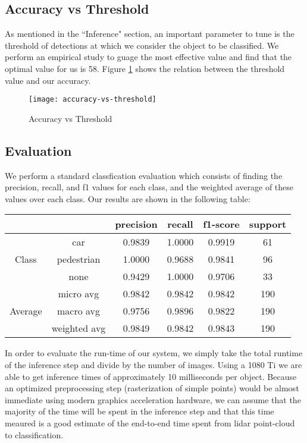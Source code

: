 \documentclass[runningheads,a4paper]{llncs}
\begin{document}
\subsection{Accuracy vs Threshold}
As mentioned in the ``Inference" section, an important parameter to tune is the threshold
of detections at which we consider the object to be classified. We perform an empirical
study to guage the most effective value and find that the optimal value for us is 58.
Figure \ref{fig:accuracy-vs-threshold} shows the relation between the threshold value
and our accuracy.


\begin{figure}[h]
  \caption{Accuracy vs Threshold}
  \centering
  \texttt{[image: accuracy-vs-threshold]}
  \label{fig:accuracy-vs-threshold}
\end{figure}


\subsection{Evaluation}
We perform a standard classfication evaluation which consists of finding the precision,
recall, and f1 values for each class, and the weighted average of these values over each
class. Our results are shown in the following table: 

\begin{center}
\begin{tabular}{ |c|c|c|c|c|c| } 
\hline
	    & & precision & recall & f1-score & support \\
\hline
\multirow{3}{4em}{Class} & car & 0.9839 & 1.0000 & 0.9919 & 61  \\
  		  & pedestrian & 1.0000 & 0.9688 & 0.9841 & 96  \\
      		      & none & 0.9429 & 1.0000 & 0.9706 & 33  \\
\hline
\multirow{3}{4em}{Average}  & micro avg & 0.9842 & 0.9842 & 0.9842 & 190 \\
   			    & macro avg & 0.9756 & 0.9896 & 0.9822 & 190 \\
			 & weighted avg & 0.9849 & 0.9842 & 0.9843 & 190 \\

 \hline
\end{tabular}
\end{center}

In order to evaluate the run-time of our system, we simply take the total runtime of the inference
step and divide by the number of images. Using a 1080 Ti we are able to get 
inference times of approximately 10 milliseconds per object. Because an 
optimized preprocessing step (rasterization of simple points) would be 
almost immediate using modern graphics acceleration hardware, we can assume 
that the majority of the time will be spent in the inference step and that 
this time meaured is a good estimate of the end-to-end time spent from lidar 
point-cloud to classification.
\end{document}
